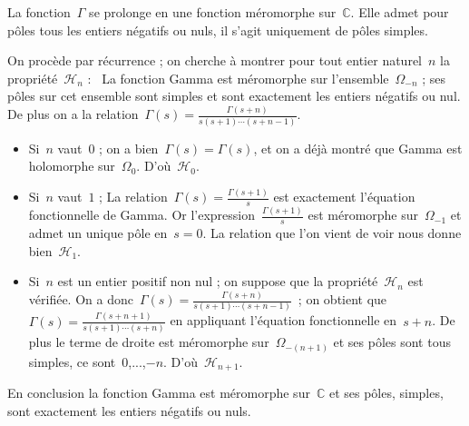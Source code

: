		\begin{prop}
			La fonction~$\Gamma$ se prolonge en une fonction méromorphe sur~$\mathbb{C}$. Elle admet pour pôles tous les entiers négatifs ou nuls, il s'agit uniquement de pôles simples.
		\end{prop}
		\begin{dem}
			On procède par récurrence ; on cherche à montrer pour tout entier naturel~$n$ la propriété~$\mathcal{H}_n$ : \og~La fonction Gamma est méromorphe sur l'ensemble~$\Omega_{-n}$ ; ses pôles sur cet ensemble sont simples et sont exactement les entiers négatifs ou nul. De plus on a la relation~$\Gamma(s) = \frac{\Gamma(s+n)}{s(s+1)\cdots(s+n-1)}$.~\fg
			\begin{itemize}
				\item Si~$n$ vaut~$0$ ; on a bien~$\Gamma(s)=\Gamma(s)$, et on a déjà montré que Gamma est holomorphe sur~$\Omega_0$. D'où~$\mathcal{H}_0$.
				\item Si~$n$ vaut~$1$ ; La relation~$\Gamma(s)=\frac{\Gamma(s+1)}{s}$ est exactement l'équation fonctionnelle de Gamma. Or l'expression~$\frac{\Gamma(s+1)}{s}$ est méromorphe sur~$\Omega_{-1}$ et admet un unique pôle en~$s=0$. La relation que l'on vient de voir nous donne bien~$\mathcal{H}_1$.
				\item Si~$n$ est un entier positif non nul ; on suppose que la propriété~$\mathcal{H}_n$ est vérifiée. On a donc~$\Gamma(s) = \frac{\Gamma(s+n)}{s(s+1)\cdots(s+n-1)}$~; on obtient que~$\Gamma(s) = \frac{\Gamma(s+n+1)}{s(s+1)\cdots(s+n)}$ en appliquant  l'équation fonctionnelle en~$s+n$. De plus le terme de droite est méromorphe sur~$\Omega_{-(n+1)}$ et ses pôles sont tous simples, ce sont~$0$,...,$-n$. D'où~$\mathcal{H}_{n+1}$.
			\end{itemize}
			En conclusion la fonction Gamma est méromorphe sur~$\mathbb{C}$ et ses pôles, simples, sont exactement les entiers négatifs ou nuls.
		\end{dem}
	\boldmath	
